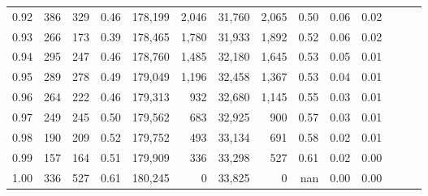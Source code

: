 \begin{tabular}{rrrrrrrrrrrrrr}
0.92 &    386 &  329 &  0.46 &  178,199 &    2,046 &  31,760 &   2,065 &  0.50 &  0.06 &      0.02 \\
0.93 &    266 &  173 &  0.39 &  178,465 &    1,780 &  31,933 &   1,892 &  0.52 &  0.06 &      0.02 \\
0.94 &    295 &  247 &  0.46 &  178,760 &    1,485 &  32,180 &   1,645 &  0.53 &  0.05 &      0.01 \\
0.95 &    289 &  278 &  0.49 &  179,049 &    1,196 &  32,458 &   1,367 &  0.53 &  0.04 &      0.01 \\
0.96 &    264 &  222 &  0.46 &  179,313 &      932 &  32,680 &   1,145 &  0.55 &  0.03 &      0.01 \\
0.97 &    249 &  245 &  0.50 &  179,562 &      683 &  32,925 &     900 &  0.57 &  0.03 &      0.01 \\
0.98 &    190 &  209 &  0.52 &  179,752 &      493 &  33,134 &     691 &  0.58 &  0.02 &      0.01 \\
0.99 &    157 &  164 &  0.51 &  179,909 &      336 &  33,298 &     527 &  0.61 &  0.02 &      0.00 \\
1.00 &    336 &  527 &  0.61 &  180,245 &        0 &  33,825 &       0 &   nan &  0.00 &      0.00 \\
\bottomrule
\end{tabular}
